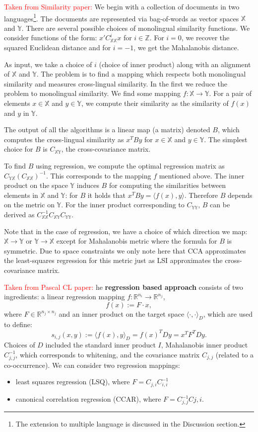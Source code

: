 \documentclass[twoside,11pt]{article}
\newcommand{\oldText}[1]{\textcolor{red}{#1:}\color{blue}}
\newcommand{\RR}{\mathbb{R}}
\newcommand{\X}{\mathbb{X}}
\newcommand{\Y}{\mathbb{Y}}
\begin{document}
{\oldText{Taken from Similarity paper}
We begin with a collection of documents in two languages\footnote{The extension to multiple language is  discussed in the Discussion section.}. The documents are represented via bag-of-words as vector spaces $\X$ and $\Y$. There are several possible choices of monolingual similarity functions. We consider functions of the form: $x'C_{\X\X}^i x$ for $i\in \mathbb{Z}$. For $i=0$, we recover the squared Euclidean distance and for $i=-1$, we get the Mahalanobis distance.

As input, we take a choice of $i$ (choice of inner product) along with an alignment of $\X$ and $\Y$. The problem is to find a mapping which respects both monolingual similarity and measures cross-lingual similarity.  In the first we reduce the problem to monolingual similarity. We find some mapping $f: \X \rightarrow \Y$. For a pair of elements $x\in\X$ and $y\in\Y$, we compute their similarity as the similarity of $f(x)$ and $y$ in $\Y$.

The output of all the algorithms is a linear map (a matrix) denoted $B$, which computes the cross-lingual similarity as $x^T B y$ for $x\in\X$ and $y \in \Y$. The simplest choice for $B$ is $C_{\X\Y}$, the cross-covariance matrix.

To find $B$ using regression, we compute the optimal regression matrix as $ C_{\Y \X} (C_{\X \X})^{-1}$. This corresponds to the mapping $f$ mentioned above.  The inner product on the space $\Y$ induces $B$ for computing the similarities between elements in $\X$ and $\Y$: for $B$ it holds that $x^T B y = \langle f (x), y \rangle$. Therefore $B$ depends on the metric on $\Y$. For the inner product corresponding to $C_{\Y\Y}$, $B$ can be derived as $C_{\X \X}^{-1}C_{\X \Y}C_{\Y \Y}$.

Note that in the case of regression, we have a choice of which direction we map: $\X\rightarrow\Y$ or $\Y\rightarrow\X$ except for Mahalanobis metric where the formula for $B$ is symmetric. Due to space constraints we only note here that CCA approximates the least-squares regression for this metric just as LSI approximates the cross-covariance matrix.
}

{\oldText{Taken from Pascal CL paper}
he \textbf{regression based approach} consists of two ingredients: a linear regression mapping $f : \RR^{n_i} \rightarrow \RR^{n_j}$,$$ f(x) := F\cdot x,$$ where $F \in \RR^{n_j \times n_j}$ and an inner product on the target space $\langle \cdot, \cdot \rangle_D$, which are used to define: 
$$s_{i,j}(x,y) := \langle f(x), y \rangle_D = f(x)^T D y = x^T F^T D y.$$
Choices of $D$ included the standard inner product $I$, Mahalanobis inner product $C_{j,j}^{-1}$, which corresponds to whitening, and the covariance matrix $C_{j,j}$ (related to a co-occurrence). We can consider two regression mappings:
\begin{itemize}
\item least squares regression (LSQ), where $F = C_{j,i}C_{i,i}^{-1}$
\item canonical correlation regression\cite{ccar} (CCAR), where $F = C_{j,j}^{-1}C{j,i}$.
\end{itemize}
}
\end{document}
